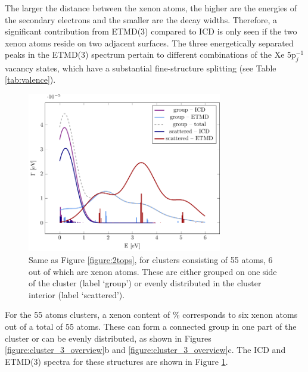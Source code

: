 The larger the distance between the xenon atoms, the higher are the energies
of the secondary electrons and the smaller are the decay widths. 
Therefore, a
significant contribution from ETMD(3) compared to ICD is only
seen if the two xenon atoms reside on two adjacent
surfaces. 
The three energetically separated peaks in the ETMD(3) spectrum pertain to different combinations of the Xe 5p$_j^{-1}$ vacancy states, which have a substantial fine-structure splitting (see Table \ref{tab:valence}). 
%

\begin{figure}[ht]
 \centering
 \includegraphics[width=8.5cm]{pics/ar_3_6in.pdf}
 \caption{Same as Figure \protect\ref{figure:2tops}, for clusters consisting of
          55 atoms, 6 out of which are xenon atoms. These are either grouped
          on one side of the cluster (label `group') or evenly distributed
          in the cluster interior (label `scattered').}
 \label{figure:ar_3_6in}
\end{figure}
%
For the 55 atoms clusters, a xenon content of \unit[10--12]{\%}
corresponds to six xenon atoms out of a total of 55 atoms. These can form a connected 
group in one part of the cluster or can be evenly distributed,
as shown in Figures \ref{figure:cluster_3_overview}b and \ref{figure:cluster_3_overview}c. The
ICD and ETMD(3) spectra for these structures are shown in Figure \ref{figure:ar_3_6in}.

